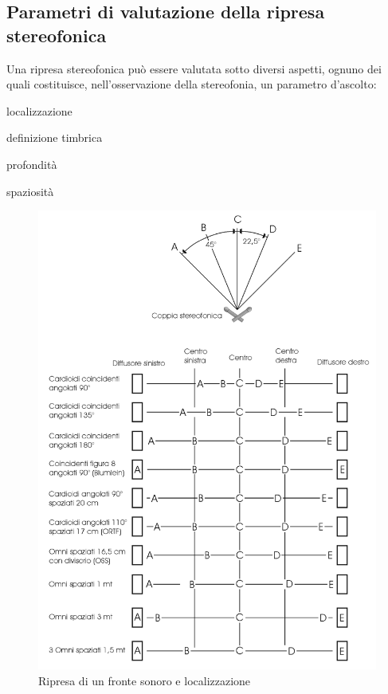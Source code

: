 \subsection{Parametri di valutazione della ripresa stereofonica}

Una ripresa stereofonica può essere valutata sotto diversi aspetti, ognuno dei
quali costituisce, nell'osservazione della stereofonia, un parametro d’ascolto:

\begin{compactitem}
\item localizzazione
\item definizione timbrica
\item profondità
\item spaziosità
\end{compactitem}

\begin{figure}[th]
\centering
\includegraphics[width=0.99\columnwidth]{CAPITOLI/1000/IMG/localizzazione}
\caption[]{Ripresa di un fronte sonoro e localizzazione}
\label{fig:localizzazione}
\end{figure}

